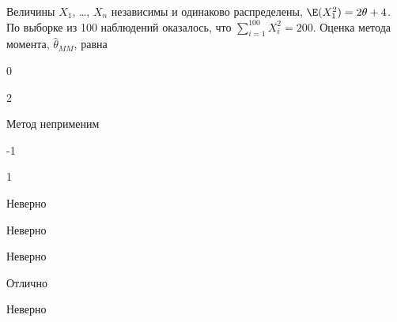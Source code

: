 
\begin{question}
Величины \(X_1\), \ldots, \(X_n\) независимы и одинаково распределены,
\(\E(X_1^2)=2\theta + 4\). По выборке из 100 наблюдений оказалось, что
\(\sum_{i=1}^{100} X_i^2 = 200\). Оценка метода момента,
\(\hat\theta_{MM}\), равна
\begin{answerlist}
  \item 0
  \item 2
  \item Метод неприменим
  \item -1
  \item 1
\end{answerlist}
\end{question}

\begin{solution}
\begin{answerlist}
  \item Неверно
  \item Неверно
  \item Неверно
  \item Отлично
  \item Неверно
\end{answerlist}
\end{solution}


